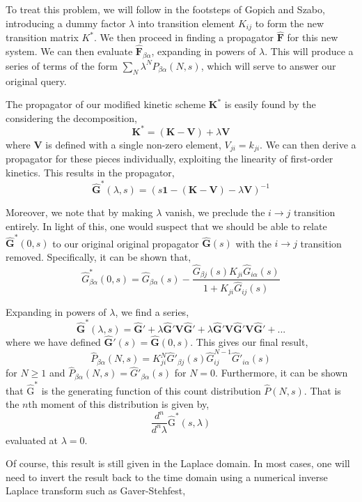 \documentclass{article}
\begin{document}
To treat this problem, we will follow in the footsteps of Gopich and
Szabo\cite{Gopich2003}, introducing a dummy factor $\lambda$ into
transition element $K_{ij}$ to form the new transition matrix $K^*$.
We then proceed in finding a propagator $\mathbf{\hat F}$ for this new
system. We can then evaluate $\mathbf{\hat F}_{\beta\alpha}$,
expanding in powers of $\lambda$. This will produce a series of terms
of the form $\sum_N \lambda^N P_{\beta\alpha}(N, s)$, which will serve
to answer our original query.

The propagator of our modified kinetic scheme $\mathbf{K}^*$ is easily
found by the considering the decomposition,
\[ \mathbf{K}^* = (\mathbf{K} - \mathbf{V}) + \lambda \mathbf{V} \]
where $\mathbf V$ is defined with a single non-zero element, $V_{ji} =
k_{ji}$. 
We can then derive a propagator for these pieces
individually, exploiting the linearity of first-order kinetics.
This results in the propagator,
\[ \mathbf{\hat G}^*(\lambda, s) = \left(s \mathbf{1} - (\mathbf{K} - \mathbf{V}) - \lambda \mathbf{V} \right)^{-1} \]

Moreover, we note that by making $\lambda$ vanish, we preclude the $i
\rightarrow j$ transition entirely. In light of this, one would suspect that we should
be able to relate $\mathbf{\hat G^*}(0, s)$ to our original original
propagator $\mathbf{\hat G}(s)$ with the $i \rightarrow j$ transition
removed. Specifically, it can be shown that,
\[ \hat G^*_{\beta\alpha}(0, s) = \hat G_{\beta\alpha}(s) -
\frac{\hat G_{\beta j}(s) K_{ji} \hat G_{i\alpha}(s)}{1 + K_{ji} \hat G_{ij}(s)}
\]

Expanding in powers of $\lambda$, we find a series,
\[ \mathbf{\hat G}^*(\lambda, s) = \mathbf{\hat G'}
  + \lambda \mathbf{\hat G'} \mathbf{V} \mathbf{\hat G'}
  + \lambda \mathbf{\hat G'} \mathbf{V} \mathbf{\hat G'} \mathbf{V} \mathbf{\hat G'}
  + ...
\]
where we have defined $\mathbf{\hat G'}(s) = \mathbf{\hat G}(0, s)$.
This gives our final result,
\[ \hat P_{\beta\alpha}(N,s) = K_{ji}^N \hat G'_{\beta j}(s) \hat G_{ij}^{N-1} \hat G'_{i\alpha}(s) \]
for $N \ge 1$ and $\hat P_{\beta\alpha}(N,s) = \hat
G'_{\beta\alpha}(s)$ for $N=0$. Furthermore, it can be shown that $\mathrm{\hat G^*}$ is the generating function of this count distribution $\hat P(N,s)$. That is the $n$th moment of this
distribution is given by,
\[ \frac{d^n}{d^n \lambda} \mathrm{\hat G^*}(s, \lambda) \]
evaluated at $\lambda = 0$.

Of course, this result is still given in the Laplace domain. In most
cases, one will need to invert the result back to the time domain
using a numerical inverse Laplace transform such as Gaver-Stehfest,
\end{document}
